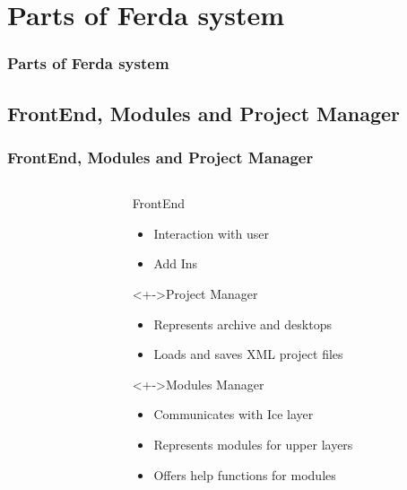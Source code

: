 \documentclass[handout]{beamer}
\begin{document}
\section{Parts of Ferda system}
\begin{frame}
	\frametitle{Parts of Ferda system}
\end{frame}

\subsection{FrontEnd, Modules and Project Manager}
\begin{frame}
	\frametitle{FrontEnd, Modules and Project Manager}
	\begin{columns}
		\begin{column}{4.5cm}
		\end{column}
		\begin{column}{6.5cm}
			\begin{block}{FrontEnd}
				\begin{itemize}[<+->]
					\item Interaction with user
					\item Add Ins
				\end{itemize}
			\end{block}
			\begin{block}<+->{Project Manager}
				\begin{itemize}[<+->]
					\item Represents archive and desktops
					\item Loads and saves XML project files
				\end{itemize}
			\end{block}
			\begin{block}<+->{Modules Manager}
				\begin{itemize}[<+->]
					\item Communicates with Ice layer
					\item Represents modules for upper layers
					\item Offers help functions for modules
				\end{itemize}
			\end{block}
		\end{column}
	\end{columns}
\end{frame}
\end{document}
